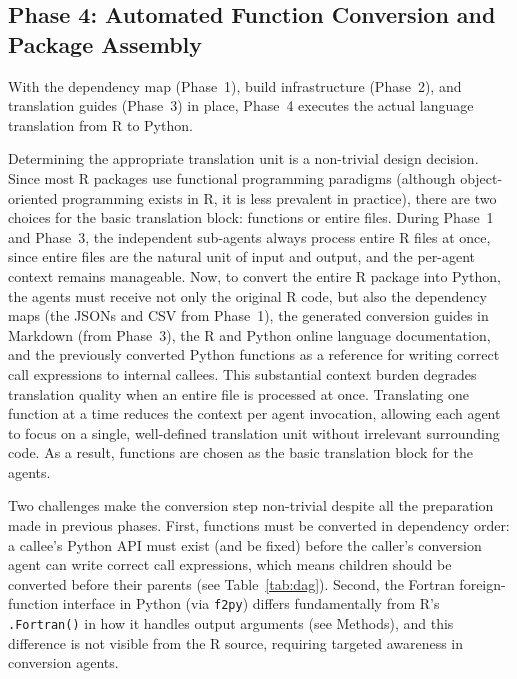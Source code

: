 \documentclass[12pt,a4paper]{article}
\newcommand{\pkg}[1]{\texttt{#1}}
\begin{document}
\subsection{Phase 4: Automated Function Conversion and Package Assembly}
\label{sec:phase4}

With the dependency map (Phase~1), build infrastructure (Phase~2), and translation guides (Phase~3) in place, Phase~4 executes the actual language translation from R to Python.

Determining the appropriate translation unit is a non-trivial design decision. Since most R packages use functional programming paradigms (although object-oriented programming exists in R, it is less prevalent in practice), there are two choices for the basic translation block: functions or entire files. During Phase~1 and Phase~3, the independent sub-agents always process entire R files at once, since entire files are the natural unit of input and output, and the per-agent context remains manageable. Now, to convert the entire R package into Python, the agents must receive not only the original R code, but also the dependency maps (the JSONs and CSV from Phase~1), the generated conversion guides in Markdown (from Phase~3), the R and Python online language documentation, and the previously converted Python functions as a reference for writing correct call expressions to internal callees. This substantial context burden degrades translation quality when an entire file is processed at once. Translating one function at a time reduces the context per agent invocation, allowing each agent to focus on a single, well-defined translation unit without irrelevant surrounding code. As a result, functions are chosen as the basic translation block for the agents.

Two challenges make the conversion step non-trivial despite all the preparation made in previous phases. First, functions must be converted in dependency order: a callee's Python API must exist (and be fixed) before the caller's conversion agent can write correct call expressions, which means children should be converted before their parents (see Table~\ref{tab:dag}). Second, the Fortran foreign-function interface in Python (via \pkg{f2py}) differs fundamentally from R's \texttt{.Fortran()} in how it handles output arguments (see Methods), and this difference is not visible from the R source, requiring targeted awareness in conversion agents.
\end{document}
